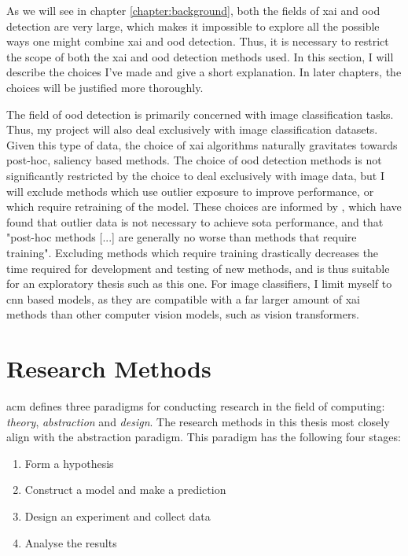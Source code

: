 \documentclass[UKenglish]{uiomasterthesis} %
\theoremstyle{definition}
\begin{document}
As we will see in chapter \ref{chapter:background}, both the fields of \ac{xai} and \ac{ood} detection are very large, which makes it impossible to explore all the possible ways one might combine \ac{xai} and \ac{ood} detection. Thus, it is necessary to restrict the scope of both the \ac{xai} and \ac{ood} detection methods used. In this section, I will describe the choices I've made and give a short explanation. In later chapters, the choices will be justified more thoroughly.

The field of \ac{ood} detection is primarily concerned with image classification tasks. Thus, my project will also deal exclusively with image classification datasets. Given this type of data, the choice of \ac{xai} algorithms naturally gravitates towards post-hoc, saliency based methods. The choice of \ac{ood} detection methods is not significantly restricted by the choice to deal exclusively with image data, but I will exclude methods which use outlier exposure to improve performance, or which require retraining of the model. These choices are informed by \cite{openood}, which have found that outlier data is not necessary to achieve \ac{sota} performance, and that "post-hoc methods [...] are generally no worse than methods that require training". Excluding methods which require training drastically decreases the time required for development and testing of new methods, and is thus suitable for an exploratory thesis such as this one. For image classifiers, I limit myself to \ac{cnn} based models, as they are compatible with a far larger amount of \ac{xai} methods than other computer vision models, such as vision transformers.

\section{Research Methods}

\ac{acm} \cite{acm} defines three paradigms for conducting research in the field of computing: {\it theory}, {\it abstraction} and {\it design}. The research methods in this thesis most closely align with the abstraction paradigm. This paradigm has the following four stages:

\begin{enumerate}
    \item Form a hypothesis
    \item Construct a model and make a prediction
    \item Design an experiment and collect data
    \item Analyse the results
\end{enumerate}
\end{document}
